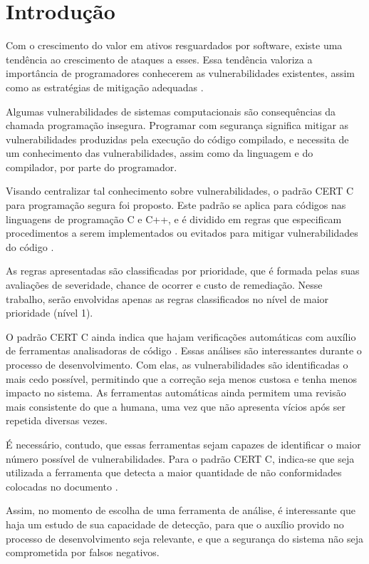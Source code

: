 \chapter{Introdução}
\label{introducao}

Com o crescimento do valor em ativos resguardados por software, existe uma tendência ao crescimento de ataques a esses. Essa tendência valoriza a importância de programadores conhecerem as vulnerabilidades existentes, assim como as estratégias de mitigação adequadas \cite{seacord2005secure}.

Algumas vulnerabilidades de sistemas computacionais são consequências da chamada programação insegura. Programar com segurança significa mitigar as vulnerabilidades produzidas pela execução do código compilado, e necessita de um conhecimento das vulnerabilidades, assim como da linguagem e do compilador, por parte do programador.

Visando centralizar tal conhecimento sobre vulnerabilidades, o padrão CERT C para programação segura foi proposto. Este padrão se aplica para códigos nas linguagens de programação C e C++, e é dividido em regras que especificam procedimentos a serem implementados ou evitados para mitigar vulnerabilidades do código \cite{certhistory}.

As regras apresentadas são classificadas por prioridade, que é formada pelas suas avaliações de severidade, chance de ocorrer e custo de remediação. Nesse trabalho, serão envolvidas apenas as regras classificados no nível de maior prioridade (nível 1).

O padrão CERT C ainda indica que hajam verificações automáticas com auxílio de ferramentas analisadoras de código \cite{ccert}. Essas análises são interessantes durante o processo de desenvolvimento. Com elas, as vulnerabilidades são identificadas o mais cedo possível, permitindo que a correção seja menos custosa e tenha menos impacto no sistema. As ferramentas automáticas ainda permitem uma revisão mais consistente do que a humana, uma vez que não apresenta vícios após ser repetida diversas vezes.

É necessário, contudo, que essas ferramentas sejam capazes de identificar o maior número possível de vulnerabilidades. Para o padrão CERT C, indica-se que seja utilizada a ferramenta que detecta a maior quantidade de não conformidades colocadas no documento \cite{ccert}.

Assim, no momento de escolha de uma ferramenta de análise, é interessante que haja um estudo de sua capacidade de detecção, para que o auxílio provido no processo de desenvolvimento seja relevante, e que a segurança do sistema não seja comprometida por falsos negativos.

